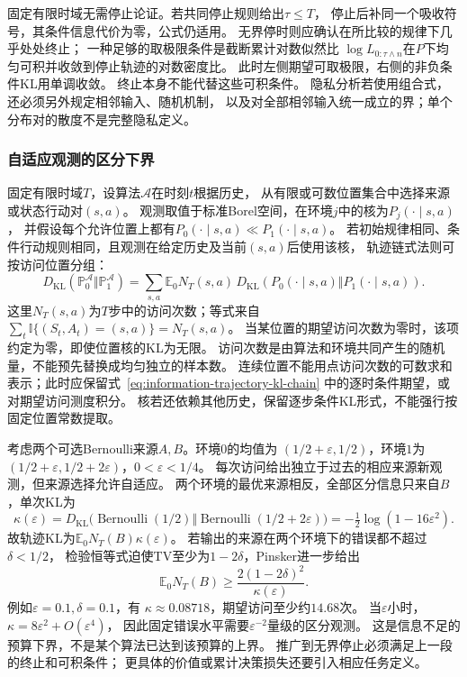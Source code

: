 固定有限时域无需停止论证。若共同停止规则给出\(\tau\leq T\)，
停止后补同一个吸收符号，其条件信息代价为零，公式仍适用。
无界停时则应确认在所比较的规律下几乎处处终止；
一种足够的取极限条件是截断累计对数似然比
\(\log L_{0:\tau\wedge n}\)在\(P\)下均匀可积并收敛到停止轨迹的对数密度比。
此时左侧期望可取极限，右侧的非负条件KL用单调收敛。
终止本身不能代替这些可积条件。
隐私分析若使用组合式，还必须另外规定相邻输入、随机机制，
以及对全部相邻输入统一成立的界；单个分布对的散度不是完整隐私定义。

\subsubsection{自适应观测的区分下界}
\label{sec:information-adaptive-lower-bounds}

固定有限时域\(T\)，设算法\(\mathcal A\)在时刻\(t\)根据历史，
从有限或可数位置集合中选择来源或状态行动对\((s,a)\)。
观测取值于标准Borel空间，在环境\(j\)中的核为\(P_j(\cdot\mid s,a)\)，
并假设每个允许位置上都有\(P_0(\cdot\mid s,a)\ll P_1(\cdot\mid s,a)\)。
若初始规律相同、条件行动规则相同，且观测在给定历史及当前\((s,a)\)后使用该核，
轨迹链式法则可按访问位置分组：
\[
  D_{\mathrm{KL}}(\mathbb P_0^{\mathcal A}\Vert\mathbb P_1^{\mathcal A})
  =\sum_{s,a}\mathbb E_0N_T(s,a)\,
      D_{\mathrm{KL}}(P_0(\cdot\mid s,a)\Vert P_1(\cdot\mid s,a)).
\]
这里\(N_T(s,a)\)为\(T\)步中的访问次数；等式来自
\(\sum_t\mathbb I\{(S_t,A_t)=(s,a)\}=N_T(s,a)\)。
当某位置的期望访问次数为零时，该项约定为零，即使位置核的KL为无限。
访问次数是由算法和环境共同产生的随机量，不能预先替换成均匀独立的样本数。
连续位置不能用点访问次数的可数求和表示；此时应保留式~\eqref{eq:information-trajectory-kl-chain}
中的逐时条件期望，或对期望访问测度积分。
核若还依赖其他历史，保留逐步条件KL形式，不能强行按固定位置常数提取。

考虑两个可选Bernoulli来源\(A,B\)。环境\(0\)的均值为
\((1/2+\varepsilon,1/2)\)，环境\(1\)为
\((1/2+\varepsilon,1/2+2\varepsilon)\)，\(0<\varepsilon<1/4\)。
每次访问给出独立于过去的相应来源新观测，但来源选择允许自适应。
两个环境的最优来源相反，全部区分信息只来自\(B\)，单次KL为
\[
  \kappa(\varepsilon)
  =D_{\mathrm{KL}}\bigl(\operatorname{Bernoulli}(1/2)
             \Vert\operatorname{Bernoulli}(1/2+2\varepsilon)\bigr)
  =-\tfrac12\log(1-16\varepsilon^2).
\]
故轨迹KL为\(\mathbb E_0N_T(B)\kappa(\varepsilon)\)。
若输出的来源在两个环境下的错误都不超过\(\delta<1/2\)，
检验恒等式迫使TV至少为\(1-2\delta\)，Pinsker进一步给出
\[
  \mathbb E_0N_T(B)\geq
  \frac{2(1-2\delta)^2}{\kappa(\varepsilon)}.
\]
例如\(\varepsilon=0.1,\delta=0.1\)，有
\(\kappa\approx0.08718\)，期望访问至少约\(14.68\)次。
当\(\varepsilon\)小时，\(\kappa=8\varepsilon^2+O(\varepsilon^4)\)，
因此固定错误水平需要\(\varepsilon^{-2}\)量级的区分观测。
这是信息不足的预算下界，不是某个算法已达到该预算的上界。
推广到无界停止必须满足上一段的终止和可积条件；
更具体的价值或累计决策损失还要引入相应任务定义。

